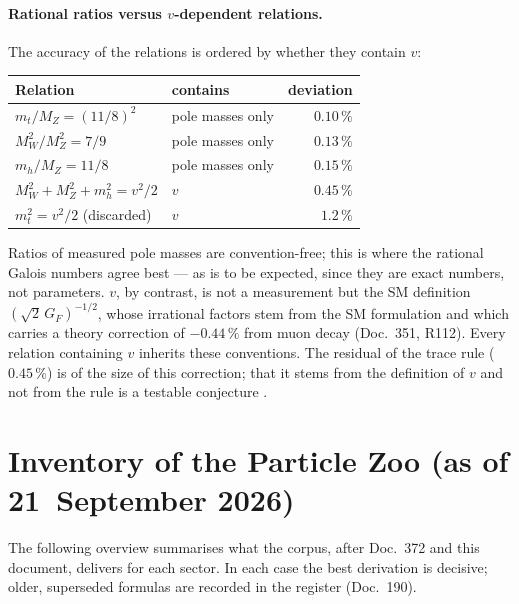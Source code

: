 \paragraph{Rational ratios versus $v$-dependent relations.}
The accuracy of the relations is ordered by whether they contain $v$:
\begin{center}
\small\begin{tabular}{@{}llr@{}}
\toprule
Relation & contains & deviation \\
\midrule
$m_t/M_Z = (11/8)^2$ & pole masses only & $0.10\,\%$ \\
$M_W^2/M_Z^2 = 7/9$ & pole masses only & $0.13\,\%$ \\
$m_h/M_Z = 11/8$ & pole masses only & $0.15\,\%$ \\
$M_W^2+M_Z^2+m_h^2 = v^2/2$ & $v$ & $0.45\,\%$ \\
$m_t^2 = v^2/2$ (discarded) & $v$ & $1.2\,\%$ \\
\bottomrule
\end{tabular}
\end{center}
Ratios of measured pole masses are convention-free; this is where the
rational Galois numbers agree best --- as is to be expected, since they are
exact numbers, not parameters. $v$, by contrast, is not a measurement but
the SM definition $(\sqrt2\,G_F)^{-1/2}$, whose irrational factors stem from
the SM formulation and which carries a theory correction of $-0.44\,\%$ from
muon decay (Doc.~351, R112). Every relation containing $v$ inherits these
conventions. The residual of the trace rule ($0.45\,\%$) is of the size of
this correction; that it stems from the definition of $v$ and not from the
rule is a testable conjecture \SM.

\section{Inventory of the Particle Zoo (as of 21~September 2026)}
\label{sec:bestand}

The following overview summarises what the corpus, after Doc.~372 and this
document, delivers for each sector. In each case the best derivation is
decisive; older, superseded formulas are recorded in the register
(Doc.~190).

